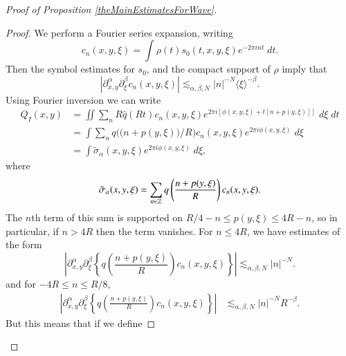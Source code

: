 \begin{proof}[Proof of Proposition \ref{theMainEstimatesForWave}]
\begin{proof}
    We perform a Fourier series expansion, writing
    \begin{equation} c_n(x,y,\xi) = \int \rho(t) s_0(t,x,y,\xi) e^{-2 \pi i n t}\; dt. \end{equation}
    Then the symbol estimates for $s_0$, and the compact support of $\rho$ imply that
    \begin{equation} |\partial_{x,y}^\alpha \partial_\xi^\beta c_n(x,y,\xi)| \lesssim_{\alpha,\beta,N} |n|^{-N} \langle \xi \rangle^{-\beta}. \end{equation}
    Using Fourier inversion we can write
    \begin{equation}
    \begin{split}
        Q_I(x,y) &= \iint \sum\nolimits_n R \widehat{q}(Rt) c_n(x,y,\xi) e^{2 \pi i [ \phi(x,y,\xi) + t [ n + p(y,\xi) ] ]}\; d\xi\; dt\\
        &= \int \sum\nolimits_n q \Big( \big( n + p(y,\xi) \big) / R \Big) c_n(x,y,\xi) e^{2 \pi i \phi(x,y,\xi)}\; d\xi\\
        &= \int \tilde{\sigma}_\alpha(x,y,\xi) e^{2 \pi i \phi(x,y,\xi)}\; d\xi, 
    \end{split}
    \end{equation}
    where
    \begin{equation} \tilde{\sigma}_\alpha(x,y,\xi) = \sum_{n \in \operatorname{\mathbb{Z}}} q \left( \frac{n + p(y,\xi)}{R} \right) c_n(x,y,\xi). \end{equation}
    The $n$th term of this sum is supported on $R/4 - n \leq p(y,\xi) \leq 4R - n$, so in particular, if $n > 4R$ then the term vanishes. For $n \leq 4R$, we have estimates of the form
    \begin{equation} \left| \partial_{x,y}^\alpha \partial_\xi^\beta \left\{ q \left( \frac{n + p(y,\xi)}{R} \right) c_n(x,y,\xi) \right\} \right| \lesssim_{\alpha,\beta,N} |n|^{-N}. \end{equation}
    and for $-4R \leq n \leq R/8$,
    \begin{equation}
    \begin{split}
        \left| \partial_{x,y}^\alpha \partial_\xi^\beta \left\{ q \left( \frac{n + p(y,\xi)}{R} \right) c_n(x,y,\xi) \right\} \right| &\lesssim_{\alpha,\beta,N} |n|^{-N} R^{-\beta}.
    \end{split}
    \end{equation}
    But this means that if we define

\end{proof}
\end{proof}
